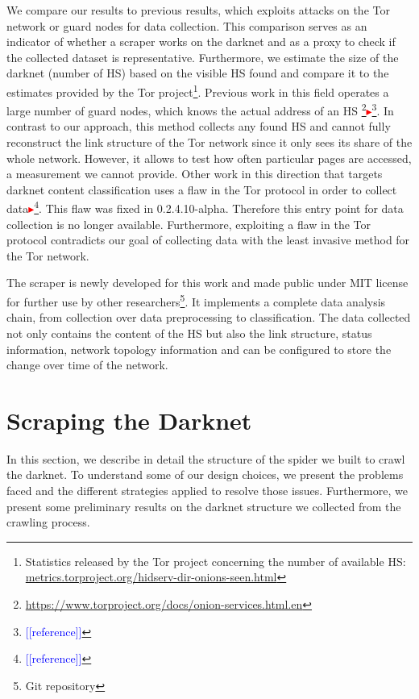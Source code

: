 \documentclass[USenglish,oneside,twocolumn]{article}
\newcommand{\nb}[1]{\textcolor{red}{$\blacktriangleright$}\footnote{\textcolor{blue}{[[#1]]}}}
\begin{document}
We compare our results to previous results, which exploits attacks on the Tor network or guard nodes for data collection. This comparison serves as an indicator of whether a scraper works on the darknet and as a proxy to check if the collected dataset is representative. Furthermore, we estimate the size of the darknet (number of HS) based on the visible HS found and compare it to the estimates provided by the Tor project\footnote{Statistics released by the Tor project concerning the number of available HS: \href{https://metrics.torproject.org/hidserv-dir-onions-seen.html?start=2018-01-01&end=2018-12-31}{metrics.torproject.org/hidserv-dir-onions-seen.html}}. 
Previous work in this field operates a large number of guard nodes, which knows the actual address of an HS \footnote{\href{https://www.torproject.org/docs/onion-services.html.en}{https://www.torproject.org/docs/onion-services.html.en}}\nb{reference}. In contrast to our approach, this method collects any found HS and cannot fully reconstruct the link structure of the Tor network since it only sees its share of the whole network. However, it allows to test how often particular pages are accessed, a measurement we cannot provide. Other work in this direction that targets darknet content classification uses a flaw in the Tor protocol in order to collect data\nb{reference}. This flaw was fixed in 0.2.4.10-alpha. Therefore this entry point for data collection is no longer available. Furthermore, exploiting a flaw in the Tor protocol contradicts our goal of collecting data with the least invasive method for the Tor network.

The scraper is newly developed for this work and made public under MIT license for further use by other researchers\footnote{Git repository}. It implements a complete data analysis chain, from collection over data preprocessing to classification. The data collected not only contains the content of the HS but also the link structure, status information, network topology information and can be configured to store the change over time of the network.

\section{Scraping the Darknet}

In this section, we describe in detail the structure of the spider we built to crawl the darknet. To understand some of our design choices, we present the problems faced and the different strategies applied to resolve those issues. Furthermore, we present some preliminary results on the darknet structure we collected from the crawling process.
\end{document}

